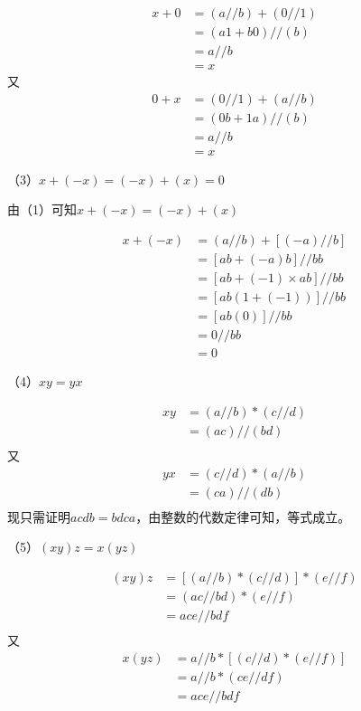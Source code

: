\documentclass{article}
\theoremstyle{mystyle}
\begin{document}
\begin{align*}
  x + 0 & = (a//b) + (0//1)  \\
        & = (a1 + b0) // (b) \\
        & = a // b           \\
        & = x
\end{align*}
又
\begin{align*}
  0 + x & = (0//1) + (a//b)  \\
        & = (0b + 1a) // (b) \\
        & = a // b           \\
        & = x
\end{align*}

（3）$x + (-x) = (-x) + (x) = 0$

由（1）可知$x + (-x) = (-x) + (x)$

\begin{align*}
  x + (-x) & = (a//b) + [(-a)//b]         \\
           & = [ab + (-a)b] // bb         \\
           & = [ab + (-1) \times ab]// bb \\
           & = [ab(1+(-1))] // bb         \\
           & = [ab(0)] // bb              \\
           & = 0 // bb                    \\
           & = 0
\end{align*}

（4）$xy = yx$

\begin{align*}
  xy & = (a//b) * (c//d) \\
     & = (ac) // (bd)    \\
\end{align*}
又
\begin{align*}
  yx & = (c//d) * (a//b) \\
     & = (ca) // (db)    \\
\end{align*}
现只需证明$acdb = bdca$，由整数的代数定律可知，等式成立。

（5）$(xy)z = x(yz)$

\begin{align*}
  (xy)z & = [(a//b) * (c//d)] * (e//f) \\
        & = (ac//bd) * (e//f)          \\
        & = ace//bdf                   \\
\end{align*}
又
\begin{align*}
  x(yz) & = a//b * [(c//d)*(e//f)] \\
        & = a//b * (ce//df)        \\
        & = ace//bdf               \\
\end{align*}
\end{document}
